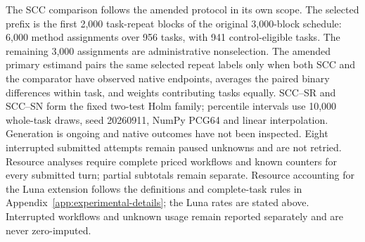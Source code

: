 The SCC comparison follows the amended protocol in its own scope. The selected prefix is the first 2,000 task-repeat blocks of the original 3,000-block schedule: 6,000 method assignments over 956 tasks, with 941 control-eligible tasks. The remaining 3,000 assignments are administrative nonselection. The amended primary estimand pairs the same selected repeat labels only when both SCC and the comparator have observed native endpoints, averages the paired binary differences within task, and weights contributing tasks equally. SCC--SR and SCC--SN form the fixed two-test Holm family; percentile intervals use 10,000 whole-task draws, seed 20260911, NumPy PCG64 and linear interpolation. Generation is ongoing and native outcomes have not been inspected. Eight interrupted submitted attempts remain paused unknowns and are not retried. Resource analyses require complete priced workflows and known counters for every submitted turn; partial subtotals remain separate.
Resource accounting for the Luna extension follows the definitions and complete-task rules in Appendix~\ref{app:experimental-details}; the Luna rates are stated above. Interrupted workflows and unknown usage remain reported separately and are never zero-imputed.
